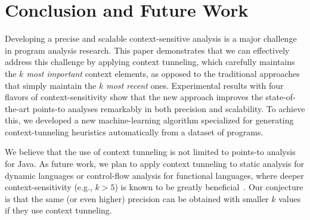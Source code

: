 \section{Conclusion and Future Work}

Developing a precise and scalable context-sensitive analysis
is a major challenge in program analysis research.  
This paper
demonstrates that we can effectively address this challenge by
applying context tunneling, which carefully maintains the
{\em $k$ most important} context elements, as opposed to the
traditional approaches that simply maintain the {\em $k$
  most recent} ones. 
Experimental results with four flavors of context-sensitivity show
that the new approach improves the state-of-the-art
points-to analyses remarkably in both
precision and scalability.
To achieve this, we developed a new machine-learning algorithm specialized for generating
context-tunneling heuristics automatically from a dataset of programs.

We believe that the use of context tunneling is not limited
to points-to analysis for Java. As future work, we plan to apply
context tunneling to static analysis
for dynamic languages or control-flow analysis for functional
languages, where deeper context-sensitivity (e.g., $k > 5$) is known to be
greatly
beneficial~\cite{park_et_al:LIPIcs:2015:5245,Kashyap2014}.
Our conjecture is that the same (or even higher) precision can be obtained with smaller
$k$ values if they use context tunneling. 



